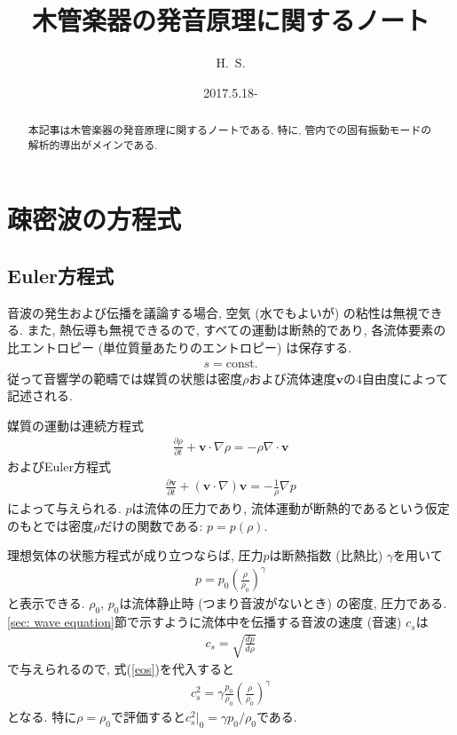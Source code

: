 \documentclass[a4paper,uplatex,dvipdfmx]{jsarticle}
\title{木管楽器の発音原理に関するノート}
\author{H.~S.}
\date{2017.5.18-}
\renewcommand{\v}{\bm{v}}
\begin{document}
\maketitle
\thispagestyle{fancy}

\begin{abstract}
	本記事は木管楽器の発音原理に関するノートである.
	特に, 管内での固有振動モードの解析的導出がメインである.
\end{abstract}

\tableofcontents

\section{疎密波の方程式}

\subsection{Euler方程式}

音波の発生および伝播を議論する場合, 空気 (水でもよいが) の粘性は無視できる.
また, 熱伝導も無視できるので, すべての運動は断熱的であり, 各流体要素の比エントロピー (単位質量あたりのエントロピー) は保存する.
\begin{align*}
	s = \mathrm{const.}
\end{align*}
従って音響学の範疇では媒質の状態は密度$\rho$および流体速度$\v$の$4$自由度によって記述される.

媒質の運動は連続方程式
\begin{align}
	\frac{ \partial \rho }{ \partial t } + \v \cdot \nabla \rho = - \rho \nabla \cdot \v
\end{align}
およびEuler方程式
\begin{align}
	\frac{ \partial \v }{ \partial t } + ( \v \cdot \nabla ) \v = - \frac{ 1 }{ \rho } \nabla p
\end{align}
によって与えられる. $p$は流体の圧力であり, 流体運動が断熱的であるという仮定のもとでは密度$\rho$だけの関数である: $p = p ( \rho )$.

理想気体の状態方程式が成り立つならば, 圧力$p$は断熱指数 (比熱比) $\gamma$を用いて
\begin{align}
	p = p_0 \left( \frac{ \rho }{ \rho_0 } \right)^\gamma \label{eos}
\end{align}
と表示できる. $\rho_0$, $p_0$は流体静止時 (つまり音波がないとき) の密度, 圧力である.
\ref{sec: wave equation}節で示すように流体中を伝播する音波の速度 (音速) $c_s$は
\begin{align}
	c_s = \sqrt{ \frac{ d p }{ d \rho } }
\end{align}
で与えられるので, 式(\ref{eos})を代入すると
\begin{align}
	c_s^2 = \gamma \frac{ p_0 }{ \rho_0 } \left( \frac{ \rho }{ \rho_0 } \right)^\gamma
\end{align}
となる. 特に$\rho = \rho_0$で評価すると$c_s^2 |_0 = \gamma p_0 / \rho_0$である.
\end{document}
